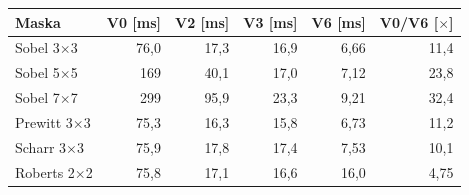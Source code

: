 \begin{tabular}{lrrrrr}
\toprule
Maska & V0 [ms] & V2 [ms] & V3 [ms] & V6 [ms] & V0/V6 [$\times$] \\
\midrule
Sobel 3$\times$3 & 76,0 & 17,3 & 16,9 & 6,66 & 11,4 \\
Sobel 5$\times$5 & 169 & 40,1 & 17,0 & 7,12 & 23,8 \\
Sobel 7$\times$7 & 299 & 95,9 & 23,3 & 9,21 & 32,4 \\
Prewitt 3$\times$3 & 75,3 & 16,3 & 15,8 & 6,73 & 11,2 \\
Scharr 3$\times$3 & 75,9 & 17,8 & 17,4 & 7,53 & 10,1 \\
Roberts 2$\times$2 & 75,8 & 17,1 & 16,6 & 16,0 & 4,75 \\
\bottomrule
\end{tabular}
